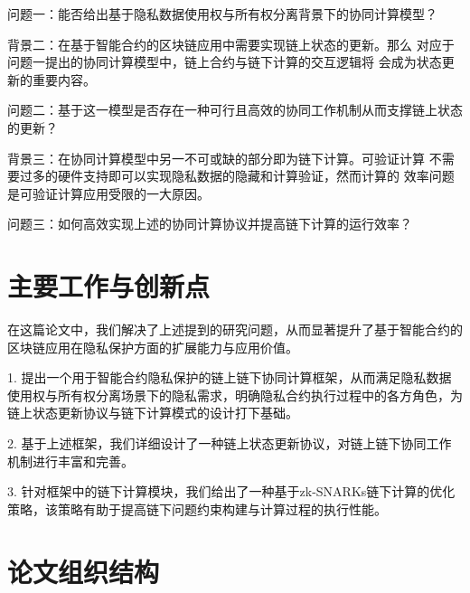 问题一：能否给出基于隐私数据使用权与所有权分离背景下的协同计算模型？

背景二：在基于智能合约的区块链应用中需要实现链上状态的更新。那么
对应于问题一提出的协同计算模型中，链上合约与链下计算的交互逻辑将
会成为状态更新的重要内容。

问题二：基于这一模型是否存在一种可行且高效的协同工作机制从而支撑链上状态的更新？

背景三：在协同计算模型中另一不可或缺的部分即为链下计算。可验证计算
不需要过多的硬件支持即可以实现隐私数据的隐藏和计算验证，然而计算的
效率问题是可验证计算应用受限的一大原因。

问题三：如何高效实现上述的协同计算协议并提高链下计算的运行效率？

\section{主要工作与创新点}

在这篇论文中，我们解决了上述提到的研究问题，从而显著提升了基于智能合约的区块链应用在隐私保护方面的扩展能力与应用价值。

1. 提出一个用于智能合约隐私保护的链上链下协同计算框架，从而满足隐私数据使用权与所有权分离场景下的隐私需求，明确隐私合约执行过程中的各方角色，为链上状态更新协议与链下计算模式的设计打下基础。

2. 基于上述框架，我们详细设计了一种链上状态更新协议，对链上链下协同工作机制进行丰富和完善。

3. 针对框架中的链下计算模块，我们给出了一种基于zk-SNARKs链下计算的优化策略，该策略有助于提高链下问题约束构建与计算过程的执行性能。

\section{论文组织结构}


